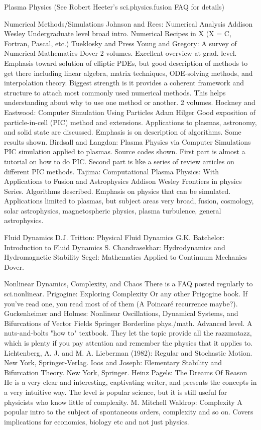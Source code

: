 \documentclass[10pt,a4paper]{book}
\theoremstyle{definition}
\begin{document}
Plasma Physics
(See Robert Heeter's sci.physics.fusion FAQ for details)




Numerical Methods/Simulations
Johnson and Rees: Numerical Analysis Addison Wesley
Undergraduate level broad intro.
Numerical Recipes in X (X = C, Fortran, Pascal, etc.) Tueklosky and Press
Young and Gregory: A survey of Numerical Mathematics Dover 2 volumes.
Excellent overview at grad. level.  Emphasis toward solution of elliptic PDEs, but good description of methods to get there including linear algebra, matrix techniques, ODE-solving methods, and interpolation theory.  Biggest strength is it provides a coherent framework and structure to attach most commonly used numerical methods.  This helps understanding about why to use one method or another.  2 volumes.
Hockney and Eastwood: Computer Simulation Using Particles Adam Hilger
Good exposition of particle-in-cell (PIC) method and extensions.  Applications to plasmas, astronomy, and solid state are discussed.  Emphasis is on description of algorithms.  Some results shown.
Birdsall and Langdon: Plasma Physics via Computer Simulations
PIC simulation applied to plasmas.  Source codes shown.  First part is almost a tutorial on how to do PIC.  Second part is like a series of review articles on different PIC methods.
Tajima: Computational Plasma Physics: With Applications to Fusion and Astrophysics Addison Wesley Frontiers in physics Series.
Algorithms described.  Emphasis on physics that can be simulated.  Applications limited to plasmas, but subject areas very broad, fusion, cosmology, solar astrophysics, magnetospheric physics, plasma turbulence, general astrophysics.



Fluid Dynamics
D.J. Tritton: Physical Fluid Dynamics
G.K. Batchelor: Introduction to Fluid Dynamics
S. Chandrasekhar: Hydrodynamics and Hydromagnetic Stability
Segel: Mathematics Applied to Continuum Mechanics Dover.



Nonlinear Dynamics, Complexity, and Chaos
There is a FAQ posted regularly to sci.nonlinear.
Prigogine: Exploring Complexity
Or any other Prigogine book.  If you've read one, you read most of of them (A Poincaré recurrence maybe?).
Guckenheimer and Holmes: Nonlinear Oscillations, Dynamical Systems, and Bifurcations of Vector Fields Springer
Borderline phys./math.  Advanced level.  A nuts-and-bolts "how to" textbook.  They let the topic provide all the razzmatazz, which is plenty if you pay attention and remember the physics that it applies to.
Lichtenberg, A. J. and M. A. Lieberman (1982): Regular and Stochastic Motion.  New York, Springer-Verlag.
Ioos and Joseph: Elementary Stability and Bifurcation Theory.  New York, Springer.
Heinz Pagels: The Dreams Of Reason
He is a very clear and interesting, captivating writer, and presents the concepts in a very intuitive way.  The level is popular science, but it is still useful for physicists who know little of complexity.
M. Mitchell Waldrop: Complexity
A popular intro to the subject of spontaneous orders, complexity and so on.  Covers implications for economics, biology etc and not just physics.
\end{document}
